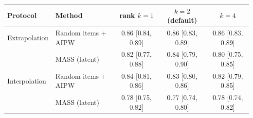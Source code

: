 \begin{tabular}{llccc}
\toprule
Protocol & Method & rank $k=1$ & $k=2$ (default) & $k=4$ \\
\midrule
Extrapolation & Random items + AIPW & 0.86 [0.84, 0.89] & 0.86 [0.83, 0.89] & 0.86 [0.83, 0.89] \\
 & MASS (latent) & 0.82 [0.77, 0.88] & 0.84 [0.79, 0.90] & 0.80 [0.75, 0.85] \\
\midrule
Interpolation & Random items + AIPW & 0.84 [0.81, 0.86] & 0.83 [0.80, 0.86] & 0.82 [0.79, 0.85] \\
 & MASS (latent) & 0.78 [0.75, 0.82] & 0.77 [0.74, 0.80] & 0.78 [0.74, 0.82] \\
\bottomrule
\end{tabular}
